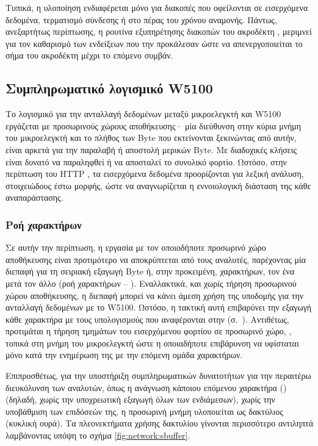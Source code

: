 Τυπικά, η υλοποίηση ενδιαφέρεται μόνο για διακοπές που οφείλονται σε εισερχόμενα
δεδομένα, τερματισμό σύνδεσης ή στο πέρας του χρόνου αναμονής. Πάντως,
ανεξαρτήτως περίπτωσης, η ρουτίνα εξυπηρέτησης διακοπών του ακροδέκτη
, μεριμνεί για τον καθαρισμό των ενδείξεων που την προκάλεσαν ώστε να
απενεργοποιείται το σήμα του ακροδέκτη μέχρι το επόμενο συμβάν.


\subsection{Συμπληρωματικό λογισμικό W5100}
\label{subsec:network:utilities}

Το λογισμικό για την ανταλλαγή δεδομένων μεταξύ μικροελεγκτή και W5100 εργάζεται
με προσωρινούς χώρους αποθήκευσης· μία διεύθυνση στην κύρια μνήμη του
μικροελεγκτή και το πλήθος των Byte που εκτείνονται ξεκινώντας από αυτήν, είναι
αρκετά για την παραλαβή ή αποστολή μερικών Byte. Με διαδοχικές κλήσεις είναι
δυνατό να παραληφθεί ή να αποσταλεί το συνολικό φορτίο. Ωστόσο, στην περίπτωση
του HTTP , τα εισερχόμενα δεδομένα προορίζονται για λεξική ανάλυση,
στοιχειώδους έστω μορφής, ώστε να αναγνωρίζεται η εννοιολογική διάσταση της κάθε
αναπαράστασης.


\subsubsection{Ροή χαρακτήρων}
\label{ssubsec:network:sbuffer}

Σε αυτήν την περίπτωση, η εργασία με τον οποιοδήποτε προσωρινό χώρο αποθήκευσης
είναι προτιμότερο να αποκρύπτεται από τους αναλυτές, παρέχοντας μία διεπαφή για
τη σειριακή εξαγωγή Byte ή, στην προκειμένη, χαρακτήρων, τον ένα μετά τον άλλο
(ροή χαρακτήρων -- ).
Εναλλακτικά, και χωρίς τήρηση προσωρινού χώρου αποθήκευσης, η διεπαφή μπορεί να
κάνει άμεση χρήση της υποδομής για την ανταλλαγή δεδομένων με το W5100. Ωστόσο,
η τακτική αυτή επιβαρύνει την εξαγωγή κάθε χαρακτήρα με τους υπολογισμούς που
αναφέρονται στην 
(σ.~\pageref{ssubsec:network:rx-tx-buffer}). Αντιθέτως, προτιμάται η τήρηση
τμημάτων του εισερχόμενου φορτίου σε προσωρινό χώρο, , τοπικά στη
μνήμη του μικροελεγκτή ώστε η οποιαδήποτε επιβάρυνση να υφίσταται μόνο κατά την
ενημέρωση της  με την επόμενη ομάδα χαρακτήρων.

Επιπροσθέτως, για την υποστήριξη συμπληρωματικών δυνατοτήτων για την περαιτέρω
διευκόλυνση των αναλυτών, όπως η ανάγνωση κάποιου επόμενου χαρακτήρα () (δηλαδή, χωρίς την υποχρεωτική εξαγωγή όλων των ενδιάμεσων), χωρίς την
υποβάθμιση των επιδόσεών της, η προσωρινή μνήμη υλοποιείται ως δακτύλιος
(κυκλική ουρά). Τα πλεονεκτήματα χρήσης δακτυλίου γίνονται περισσότερο αντιληπτά
λαμβάνοντας υπόψη το σχήμα \ref{fig:network:sbuffer}.


